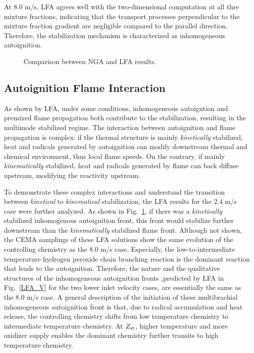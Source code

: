 \documentclass{wssci}
\begin{document}
At $8.0$ m/s, LFA agrees well with the two-dimensional computation at all thre mixture fractions, indicating that the transport processes perpendicular to the mixture fraction gradient are negligible compared to the parallel direction.  Therefore, the stabilization mechanism is characterized as inhomogeneous autoignition.

\begin{figure}
  \centering
  \scriptsize
  
  \normalsize
  \caption{Comparison between NGA and LFA results.}
  \label{fig:LFA_V}
\end{figure}

\subsection{Autoignition Flame Interaction}

As shown by LFA, under some conditions, inhomogeneous autoigntion and premixed flame propagation both contribute to the stabilization, resulting in the multimode stabilized regime.  The interaction between autoignition and flame propagation is complex: if the thermal structure is mainly \emph{kinetically} stabilized, heat and radicals generated by autoignition can modify downstream thermal and chemical environment, thus local flame speeds.  On the contrary, if mainly \emph{kinematically} stabilized, heat and radicals generated by flame can back diffuse upstream, modifying the reactivity upstream.  

To demonstrate these complex interactions and understand the transition between \emph{kinetical} to \emph{kinematical} stabilization, the LFA results for the $2.4$ m/s case were further analyzed.  As shown in Fig.~\ref{fig:LFA_V}, if there was a \emph{kinetically} stabilized inhomogenous autoignition front, this front would stabilize further downstream than the \emph{kinematically} stabilized flame front.  Although not shown, the CEMA samplings of these LFA solutions show the same evolution of the controlling chemistry as the $8.0$ m/s case.  Especially, the low-to-intermediate temperature hydrogen peroxide chain branching reaction is the dominant reaction that leads to the autoignition.  Therefore, the nature and the qualitative structures of the inhomogeneous autoignition fronts ,predicted by LFA in Fig.~\ref{LFA_V} for the two lower inlet velocity cases, are essentially the same as the $8.0$ m/s case.  A general description of the initiation of these multibrachial inhomogeneous autoignition front is that, due to radical accumulation and heat release, the controlling chemistry shifts from low temperature chemistry to intermediate temperature chemistry.  At $Z_{\rm st}$, higher temperature and more oxidizer supply enables the dominant chemistry further transits to high temperature chemistry.   
\end{document}
